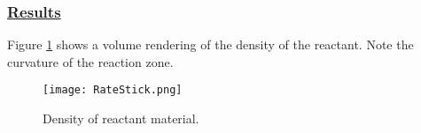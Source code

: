 \subsubsection*{\underline{Results}}
Figure \ref{fig:RateStick} shows a volume rendering of the density of the
reactant.  Note the curvature of the reaction zone.
\begin{figure}
 \texttt{[image: RateStick.png]}
\caption{Density of reactant material.}
\label{fig:RateStick}
\end{figure}

\newpage


%
%
